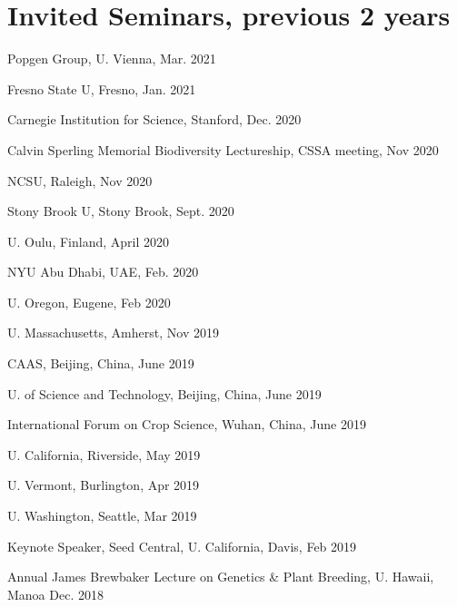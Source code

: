 \documentclass[letterpaper,10pt]{article}
\renewenvironment{itemize}{
  \begin{list}{}{
    \setlength{\leftmargin}{1.5em}
  }
}{
  \end{list}
}
\begin{document}
\section*{Invited Seminars, previous 2 years}
\begin{itemize}
\setlength\itemsep{0ex}
\item Popgen Group, U. Vienna, Mar. 2021
\item Fresno State U, Fresno, Jan. 2021
\item Carnegie Institution for Science, Stanford, Dec. 2020
\item Calvin Sperling Memorial Biodiversity Lectureship, CSSA meeting, Nov 2020
\item NCSU, Raleigh, Nov 2020
\item Stony Brook U, Stony Brook, Sept. 2020
\item U. Oulu, Finland, April 2020
\item NYU Abu Dhabi, UAE, Feb. 2020
\item U. Oregon, Eugene, Feb 2020
\item U. Massachusetts, Amherst, Nov 2019
\item CAAS, Beijing, China, June 2019
\item U. of Science and Technology, Beijing, China, June 2019
\item International Forum on Crop Science, Wuhan, China, June 2019
\item U. California, Riverside, May 2019
\item U. Vermont, Burlington, Apr 2019
\item U. Washington, Seattle, Mar 2019
\item Keynote Speaker, Seed Central, U. California, Davis, Feb 2019
\item Annual James Brewbaker Lecture on Genetics \& Plant Breeding, U. Hawaii, Manoa Dec. 2018

\end{itemize}
\end{document}
